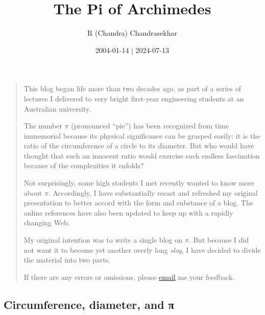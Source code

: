 \documentclass[
  a4paper,
]{article}
\title{The Pi of Archimedes}
\author{R (Chandra) Chandrasekhar}
\date{2004-01-14 | 2024-07-13}
\begin{document}
\maketitle

\thispagestyle{empty}


\begin{quote}
This blog began life more than two decades ago, as part of a series of
lectures I delivered to very bright first-year engineering students at
an Australian university.

The number \(\pi\) (pronounced ``pie'') has been recognized from time
immemorial because its physical significance can be grasped easily: it
is the ratio of the circumference of a circle to its diameter. But who
would have thought that such an innocent ratio would exercise such
endless fascination because of the complexities it enfolds?

Not surprisingly, some high students I met recently wanted to know more
about \(\pi\). Accordingly, I have substantially recast and refreshed my
original presentation to better accord with the form and substance of a
blog. The online references have also been updated to keep up with a
rapidly changing Web.

My original intention was to write a single blog on \(\pi\). But because
I did not want it to become yet another overly long \emph{slog}, I have
decided to divide the material into two parts.

If there are any errors or omissions, please
\href{mailto:feedback.swanlotus@gmail.com}{email} me your feedback.
\end{quote}

\subsection{Circumference, diameter, and
π}\label{circumference-diameter-and-ux3c0}
\end{document}
